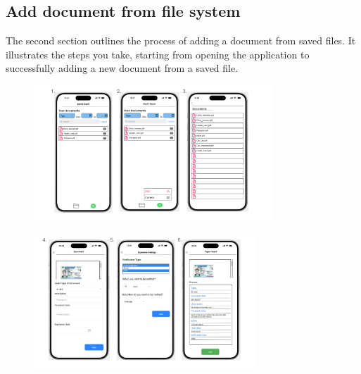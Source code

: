 	\subsection{Add document from file system}
		The second section outlines the process of adding a document from saved files. It illustrates the steps you take, starting from opening the application to successfully adding a new document from a saved file.
		\begin{figure}[htbp]
			\centering
			\includegraphics[width=0.80\textwidth]{../mockups/add_doc_pdf_1.png}  %
		\end{figure}
		
		\begin{figure}[htbp]
			\centering
			\includegraphics[width=0.75\textwidth]{../mockups/add_doc_pdf_2.png}  %
		\end{figure}
		\clearpage
